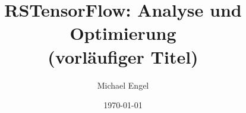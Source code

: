 \documentclass{IEEEtran}
\title{RSTensorFlow: Analyse und Optimierung\\(vorläufiger Titel)}
\author{Michael Engel}
\date{\today}
\begin{document}
\maketitle











{}
\end{document}

